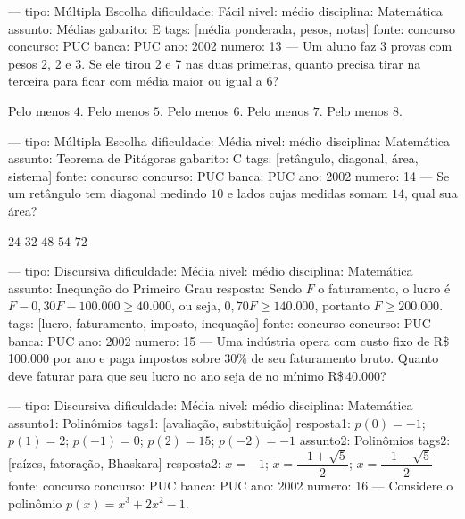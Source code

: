 ---
tipo: Múltipla Escolha
dificuldade: Fácil
nivel: médio
disciplina: Matemática
assunto: Médias
gabarito: E
tags: [média ponderada, pesos, notas]
fonte: concurso
concurso: PUC
banca: PUC
ano: 2002
numero: 13
---
\question
Um aluno faz 3 provas com pesos 2, 2 e 3. Se ele tirou 2 e 7 nas duas primeiras, quanto precisa tirar na terceira para ficar com média maior ou igual a 6?
\begin{choices}
\choice Pelo menos $4$.
\choice Pelo menos $5$.
\choice Pelo menos $6$.
\choice Pelo menos $7$.
\CorrectChoice Pelo menos $8$.
\end{choices}

---
tipo: Múltipla Escolha
dificuldade: Média
nivel: médio
disciplina: Matemática
assunto: Teorema de Pitágoras
gabarito: C
tags: [retângulo, diagonal, área, sistema]
fonte: concurso
concurso: PUC
banca: PUC
ano: 2002
numero: 14
---
\question
Se um retângulo tem diagonal medindo $10$ e lados cujas medidas somam $14$, qual sua área?
\begin{choices}
\choice $24$
\choice $32$
\CorrectChoice $48$
\choice $54$
\choice $72$
\end{choices}

---
tipo: Discursiva
dificuldade: Média
nivel: médio
disciplina: Matemática
assunto: Inequação do Primeiro Grau
resposta: Sendo $F$ o faturamento, o lucro é $F - 0{,}30F - 100{.}000 \geq 40{.}000$, ou seja, $0{,}70F \geq 140{.}000$, portanto $F \geq 200{.}000$.
tags: [lucro, faturamento, imposto, inequação]
fonte: concurso
concurso: PUC
banca: PUC
ano: 2002
numero: 15
---
\question
Uma indústria opera com custo fixo de R\$\,100.000 por ano e paga impostos sobre 30\% de seu faturamento bruto. Quanto deve faturar para que seu lucro no ano seja de no mínimo R\$\,40.000?

---
tipo: Discursiva
dificuldade: Média
nivel: médio
disciplina: Matemática
assunto1: Polinômios
tags1: [avaliação, substituição]
resposta1: $p(0) = -1$; $p(1) = 2$; $p(-1) = 0$; $p(2) = 15$; $p(-2) = -1$
assunto2: Polinômios
tags2: [raízes, fatoração, Bhaskara]
resposta2: $x = -1$; $x = \dfrac{-1+\sqrt{5}}{2}$; $x = \dfrac{-1-\sqrt{5}}{2}$
fonte: concurso
concurso: PUC
banca: PUC
ano: 2002
numero: 16
---
\question
Considere o polinômio $p(x) = x^3 + 2x^2 - 1$.

